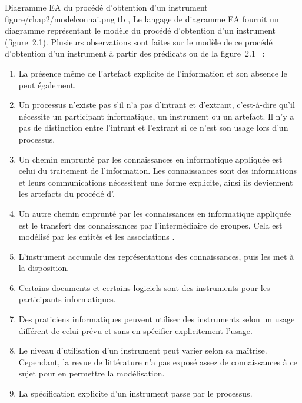 {\figgm
{Diagramme EA du procédé d'obtention d'un instrument}
{figure/chap2/modelconnai.png}
{}{}{}{tb}
\sep
Le langage de diagramme EA fournit un diagramme représentant le modèle du procédé d'obtention d'un instrument (figure~2.1).
Plusieurs observations sont faites sur le modèle de ce procédé d'obtention d'un instrument à partir des prédicats ou de la figure~2.1 ~:
\begin{enumerate}[label=\alph*)]
    \item La présence même de l'artefact explicite de l'information et son absence le peut également.
    \item Un processus n'existe pas s'il n'a pas d’intrant et d'extrant, c'est-à-dire qu'il nécessite un participant informatique, un instrument ou un artefact. Il n'y a pas de distinction entre l'intrant et l'extrant si ce n'est son usage lors d'un processus.
    \item Un chemin emprunté par les connaissances en informatique appliquée est celui du traitement de l'information. Les connaissances sont des informations et leurs communications nécessitent une forme explicite, ainsi ils deviennent les artefacts du procédé d'.
    \item Un autre chemin emprunté par les connaissances en informatique appliquée est le transfert des connaissances par l'intermédiaire de groupes. Cela est modélisé par les entités et les associations .
    \item L'instrument accumule des représentations des connaissances, puis les met à la disposition.
    \item Certains documents et certains logiciels sont des instruments pour les participants informatiques.
    \item Des praticiens informatiques peuvent utiliser des instruments selon un usage différent de celui prévu et sans en spécifier explicitement l'usage.
    \item Le niveau d'utilisation d'un instrument peut varier selon sa maîtrise. Cependant, la revue de littérature n'a pas exposé assez de connaissances à ce sujet pour en permettre la modélisation.
    \item La spécification explicite d'un instrument passe par le processus.
\end{enumerate}
}{}{}

